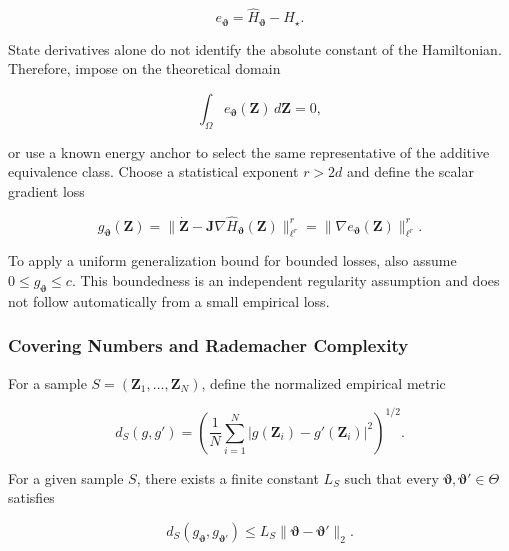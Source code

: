 \begin{equation}
\label{eq:chnn-4-37}
e_{\bm{\vartheta}} = {\widehat{H}}_{\bm{\vartheta}} - H_{\star}.
\end{equation}

State derivatives alone do not identify the absolute constant of the Hamiltonian. Therefore, impose on the theoretical domain

\begin{equation}
\label{eq:chnn-4-38}
\int_{\Omega}^{}e_{\bm{\vartheta}}\left( \mathbf{Z} \right)\, d\mathbf{Z} = 0,
\end{equation}

or use a known energy anchor to select the same representative of the additive equivalence class. Choose a statistical exponent \(r>2d\) and define the scalar gradient loss

\begin{equation}
\label{eq:chnn-4-39}
g_{\bm{\vartheta}}\left( \mathbf{Z} \right) = \left. \parallel\dot{\mathbf{Z}} - \mathbf{J}\nabla{\widehat{H}}_{\bm{\vartheta}}\left( \mathbf{Z} \right) \right.\parallel_{\ell^{r}}^{r} = \left. \parallel\nabla e_{\bm{\vartheta}}\left( \mathbf{Z} \right) \right.\parallel_{\ell^{r}}^{r}.
\end{equation}

To apply a uniform generalization bound for bounded losses, also assume \(0 \leq g_{\bm{\vartheta}} \leq c\). This boundedness is an independent regularity assumption and does not follow automatically from a small empirical loss.

\subsubsection{Covering Numbers and Rademacher Complexity}\label{sec:chnn-4-6-3}

For a sample \(S=\left(\mathbf{Z}_{1},\ldots,\mathbf{Z}_{N}\right)\), define the normalized empirical metric

\begin{equation}
\label{eq:chnn-4-40}
d_{S}(g,g\prime) = \left( \frac{1}{N}\sum_{i = 1}^{N}\left| g\left( \mathbf{Z}_{i} \right) - g\prime\left( \mathbf{Z}_{i} \right) \right|^{2} \right)^{1/2}.
\end{equation}

\begin{assumption}\label{ass:parametric-loss-lipschitz}
For a given sample \(S\), there exists a finite constant \(L_{S}\) such that every \(\bm{\vartheta},\bm{\vartheta}\prime \in \Theta\) satisfies

\begin{equation}
\label{eq:chnn-4-41}
d_{S}\left( g_{\bm{\vartheta}},g_{\bm{\vartheta}\prime} \right) \leq L_{S}\left. \parallel\bm{\vartheta} - \bm{\vartheta}\prime \right.\parallel_{2}.
\end{equation}
\end{assumption}

